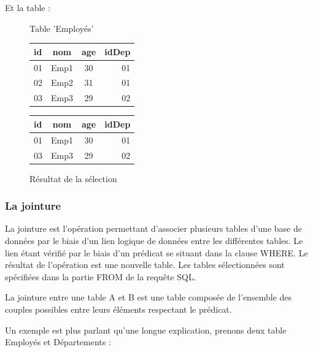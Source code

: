 \documentclass[oneside,13pt,a4paper]{report}
\begin{document}
Et la table :
\begin{figure}[h]
	\begin{minipage}[c]{.46\linewidth}
		\centering
		\caption{Table 'Employés'}
		\begin{tabular}{|l|c|c|r|}
			\hline
			id & nom  & age & idDep
			\\
			\hline
			01 & Emp1 & 30  & 01    \\
			02 & Emp2 & 31  & 01    \\
			03 & Emp3 & 29  & 02    \\
			\hline
		\end{tabular}
	\end{minipage}
	\hfill%
	\begin{minipage}[c]{.46\linewidth}
		\centering
		\caption{Résultat de la sélection}
		\vspace{0.1cm}
		\begin{tabular}{|l|c|c|r|}
			\hline
			id & nom  & age & idDep
			\\
			\hline
			01 & Emp1 & 30  & 01    \\
			03 & Emp3 & 29  & 02    \\
			\hline
		\end{tabular}
	\end{minipage}
\end{figure}

\subsubsection{La jointure}

La jointure est l'opération permettant d'associer plusieurs tables d'une base de données par le biais d'un lien logique de données entre les différentes tables. Le lien étant vérifié par le biais d'un prédicat se situant dans la clause WHERE. Le résultat de l'opération est une nouvelle table. Les tables sélectionnées sont spécifiées dans la partie FROM de la requête SQL.

La jointure entre une table A et B est une table composée de l'ensemble des couples possibles entre leurs éléments respectant le prédicat.

Un exemple est plus parlant qu'une longue explication, prenons deux table Employés et Départements :
\end{document}
